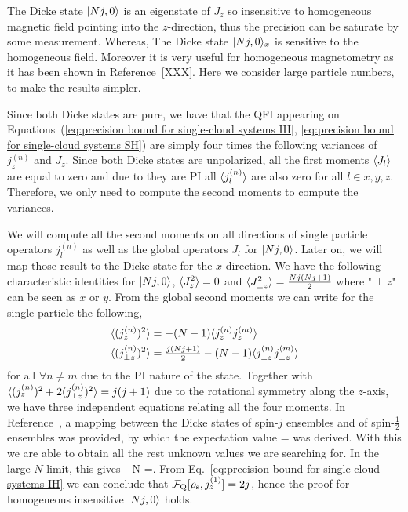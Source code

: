 The Dicke state $\vert Nj, 0 \rangle$ is an eigenstate of $J_z$ so insensitive to homogeneous magnetic field pointing into the $z$-direction, thus the precision can be saturate by some measurement.
Whereas, The Dicke state $\vert Nj, 0 \rangle_x$ is sensitive to the homogeneous field.
Moreover it is very useful for homogeneous magnetometry as it has been shown in Reference~[XXX].
Here we consider large particle numbers, to make the results simpler.

Since both Dicke states are pure, we have that
the QFI appearing on Equations~(\ref{eq:precision bound for single-cloud
systems IH}, \ref{eq:precision bound for single-cloud
systems SH}) are simply four times the following variances of $j_z^{(n)}$ and $J_z$.
Since both Dicke states are unpolarized, all the first moments $\langle J_l \rangle$ are equal to zero and due to they are PI all $\langle j_l^{(n)} \rangle$ are also zero for all $l\in x,y,z$.
Therefore, we only need to compute the second moments to compute the variances.


We will compute all the second moments on all directions of single particle operators $j_l^{(n)}$ as well as the global operators $J_l$ for $\vert Nj,0 \rangle$.
Later on, we will map those result to the Dicke state for the $x$-direction.
We have the following characteristic identities for $\vert Nj,0 \rangle$, $\langle J_z^2 \rangle = 0$ and $\langle J_{\perp z}^2 \rangle = \frac{Nj(Nj+1)}{2}$ where "${\perp}{z}$" can be seen as $x$ or $y$.
From the global second moments we can write for the single particle the following,
\begin{align}
  \langle (j_z^{(n)})^2 \rangle &= -(N-1)\langle j_z^{(n)}j_z^{(m)} \rangle \\
  \langle (j_{\perp z}^{(n)})^2 \rangle &= \tfrac{j(Nj+1)}{2}-(N-1)\langle j_{\perp z}^{(n)}j_{\perp z}^{(m)} \rangle
\end{align}
for all $\forall n\neq m$ due to the PI nature of the state.
Together with $\langle (j_z^{(n)})^2+2(j_{\perp z}^{(n)})^2 \rangle = j(j+1)$ due to the rotational symmetry along the $z$-axis, we have three independent equations relating all the four moments.
In Reference~\citep{Urizar-Lanz2013}, a mapping between the Dicke states of spin-$j$ ensembles and of spin-$\frac{1}{2}$ ensembles was provided, by which the expectation value
\be
  = 
\ee
was derived.
With this we are able to obtain all the rest unknown values we are searching for.
In the large $N$ limit, this gives
\be
\label{eq:jz2 for dicke state large number of particles}
\lim_{N \to \infty} =.
\ee
From Eq.~\eqref{eq:precision bound for single-cloud
systems IH} we can conclude that $\mathcal{F}_{\text{Q}}[\rho_{\rm s},j_z^{(1)}]=2j$,
hence the proof for homogeneous insensitive $\vert Nj,0 \rangle$ holds.

